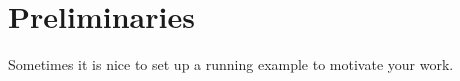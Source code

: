 \section{Preliminaries}\label{sec:prelim}
Sometimes it is nice to set up a running example to motivate your work.